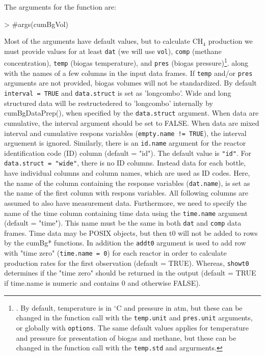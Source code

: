 \documentclass{article}
\begin{document}
The arguments for the function are:

\begin{Schunk}
\begin{Sinput}
>   #args(cumBgVol)
\end{Sinput}
\end{Schunk}

Most of the arguments have default values, but to calculate CH$_4$ production we must provide values for at least  \texttt{dat} (we will use \texttt{vol}), \texttt{comp} (methane concentration), \texttt{temp} (biogas temperature), and \texttt{pres} (biogas pressure)\footnote{.      
  By default, temperature is in $^\circ$C and pressure in atm, but these can be changed in the function call with the \texttt{temp.unit} and \texttt{pres.unit} arguments, or globally with \texttt{options}. The same default values applies for temperature and pressure for presentation of biogas and methane, but these can be changed in the function call with the \texttt{temp.std} and  argurments.}. along with the names of a few columns in the input data frames. If \texttt{temp} and/or \texttt{pres} arguments are not provided, biogas volumes will not be standardized.
By default \texttt{interval = TRUE} and \texttt{data.struct} is set as 'longcombo'. Wide and long structured data will be restructedered to 'longcombo' internally by cumBgDataPrep(), when specified by the \texttt{data.struct} argument. When data are cumulative, the interval argument should be set to FALSE. When data are mixed interval and cumulative respons variables (\texttt{empty.name != TRUE}), the interval arguement is ignored. 
Similarly, there is an \texttt{id.name} argument for the reactor identification code (ID) column (default = "id"). The default value is \texttt{"id"}. For \texttt{data.struct = "wide"}, there is no ID columns. Instead data for each bottle, have individual columns and column names, which are used as ID codes. Here, the name of the column containing the response variables (\texttt{dat.name}), is set as the name of the first column with respons variables. All following columns are assumed to also have measurement data. 
Furthermore, we need to specify the name of the time column containing time data using the \texttt{time.name} argument (default = "time").
This name must be the same in both \texttt{dat} and \texttt{comp} data frames. Time data may be POSIX objects, but then t0 will not be added to rows by the cumBg* functions. In addition the \texttt{addt0} argument is used to add row with "time zero" (\texttt{time.name = 0}) for each reactor in order to calculate production rates for the first observation (default = TRUE). Whereas, \texttt{showt0} determines if the "time zero" should be returned in the output (default = TRUE if time.name is numeric and contains 0 and otherwise FALSE). 
\end{document}
